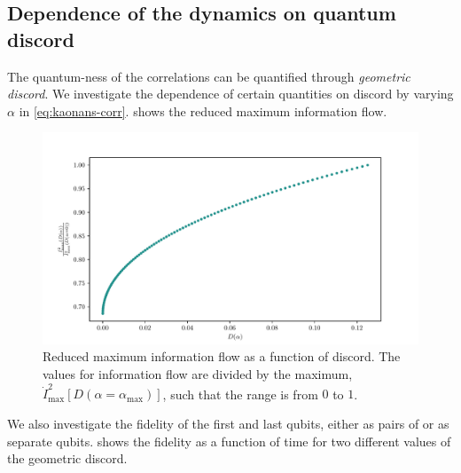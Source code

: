 \documentclass[a4paper,11pt]{scrartcl}
\begin{document}
\subsection{Dependence of the dynamics on quantum discord}
The quantum-ness of the correlations can be quantified through \emph{geometric discord}.
We investigate the dependence of certain quantities on discord by varying $\alpha$ in \cref{eq:kaonans-corr}.
 shows the reduced maximum information flow. 
\begin{figure}[H]
    \centering
    \includegraphics[width=\textwidth]{i_dot_sq_max_reduced_of_discord.pdf}
    \caption{Reduced maximum information flow as a function of discord. The values for information flow are divided
    by the maximum, $\dot{I}^2_\mathrm{max}[D(\alpha=\alpha_\mathrm{max})]$, such that the range is from $0$ to $1$.}
    \label{fig:inf-as-func-of-disc}
\end{figure}
We also investigate the fidelity of the first and last qubits, either as pairs of or as separate qubits.
 shows the fidelity as a function of time for two different values of the geometric discord.
\end{document}
